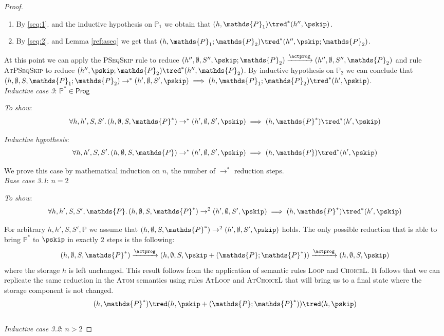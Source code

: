 \begin{thm}
{\begin{proof}
\begin{enumerate}
	\item \label{seq:2} By \ref{seq:1}. and the inductive hypothesis on $\mathds{P}_1$ we obtain that $(h, \mathds{P}_1) \tred^* (h'', \pskip)$.
	
	\item By \ref{seq:2}. and Lemma \ref{ref:aseq} we get that $(h, \mathds{P}_1 ; \mathds{P}_2) \tred^* (h'', \pskip ; \mathds{P}_2)$.
\end{enumerate}

At this point we can apply the \textsc{PSeqSkip} rule to reduce $(h'', \emptyset, S'', \pskip ; \mathds{P}_2) \xrightarrow{\actprog} (h'', \emptyset, S'', \mathds{P}_2)$ and rule \textsc{AtPSeqSkip} to reduce $(h'', \pskip ; \mathds{P}_2) \tred^* (h'', \mathds{P}_2)$. By inductive hypothesis on $\mathds{P}_2$ we can conclude that $(h, \emptyset, S, \mathds{P}_1 ; \mathds{P}_2) \rightarrow^* (h', \emptyset, S', \pskip) \implies (h, \mathds{P}_1 ; \mathds{P}_2) \tred^* (h', \pskip)$. \\

\textit{Inductive case 3}: $\mathds{P}^* \in \mathsf{Prog}$

\textit{To show}:
\[
	\forall h, h', S, S' \ldotp
	(h, \emptyset, S, \mathds{P}^*) \rightarrow^* (h', \emptyset, S', \pskip) \implies 
	(h, \mathds{P}^* ) \tred^* (h', \pskip)
\]

\textit{Inductive hypothesis}:
\[
	\forall h, h', S, S' \ldotp
	(h, \emptyset, S, \mathds{P}) \rightarrow^* (h', \emptyset, S', \pskip) \implies 
	(h, \mathds{P}) \tred^* (h', \pskip)
\]

We prove this case by mathematical induction on $n$, the number of $\rightarrow^*$ reduction steps. \\

\textit{Base case 3.1}: $n = 2$

\textit{To show}:
\[
	\forall h, h', S, S', \mathds{P} \ldotp
	(h, \emptyset, S, \mathds{P}^*) \rightarrow^{2} (h', \emptyset, S', \pskip) \implies 
	(h, \mathds{P}^*) \tred^* (h', \pskip)
\]

For arbitrary $h, h', S, S', \mathds{P}$ we assume that $(h, \emptyset, S, \mathds{P}^*) \rightarrow^{2} (h', \emptyset, S', \pskip)$ holds. The only possible reduction that is able to bring $\mathds{P}^*$ to $\pskip$ in exactly $2$ steps is the following:
\[
	(h, \emptyset, S, \mathds{P}^*) \xrightarrow{\actprog} (h, \emptyset, S, \pskip + (\mathds{P} ; \mathds{P}^*)) \xrightarrow{\actprog} (h, \emptyset, S, \pskip)
\]
where the storage $h$ is left unchanged. This result follows from the application of semantic rules \textsc{Loop} and \textsc{ChoiceL}. It follows that we can replicate the same reduction in the \textsc{Atom} semantics using rules \textsc{AtLoop} and \textsc{AtChoiceL} that will bring us to a final state where the storage component is not changed.
\[
	(h, \mathds{P}^*) \tred (h, \pskip + (\mathds{P} ; \mathds{P}^*)) \tred (h, \pskip)
\]
\\
\textit{Inductive case 3.2}: $n > 2$


\end{proof}}
\end{thm}
